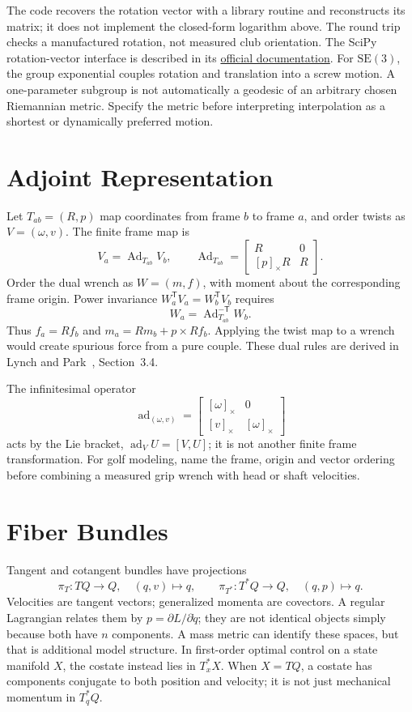 \documentclass[10pt,letterpaper,openany]{book}
\theoremstyle{plain}
\theoremstyle{definition}
\theoremstyle{remark}
\renewcommand{\T}{\mathsf{T}}   %
\renewcommand{\SE}{\mathrm{SE}}
\begin{document}
The code recovers the rotation vector with a library routine and reconstructs
its matrix; it does not implement the closed-form logarithm above. The round
trip checks a manufactured rotation, not measured club orientation.
The SciPy rotation-vector interface is described in its
\href{https://docs.scipy.org/doc/scipy/reference/generated/scipy.spatial.transform.Rotation.as_rotvec.html}{official documentation}.
For $\SE(3)$, the group exponential couples rotation and translation into a screw
motion. A one-parameter subgroup is not automatically a geodesic of an arbitrary
chosen Riemannian metric. Specify the metric before interpreting interpolation
as a shortest or dynamically preferred motion.

\section{Adjoint Representation}

Let $T_{ab}=(R,p)$ map coordinates from frame $b$ to frame $a$, and order twists
as $V=(\omega,v)$. The finite frame map is
\[
 V_a=\operatorname{Ad}_{T_{ab}}V_b,\qquad
 \operatorname{Ad}_{T_{ab}}=
 \begin{bmatrix}R&0\\ {[p]_\times R}&R\end{bmatrix}.
\]
Order the dual wrench as $W=(m,f)$, with moment about the corresponding frame
origin. Power invariance $W_a^\T V_a=W_b^\T V_b$ requires
\[
 W_a=\operatorname{Ad}_{T_{ab}}^{-\T}W_b.
\]
Thus $f_a=Rf_b$ and $m_a=Rm_b+p\times Rf_b$. Applying the twist map to a wrench
would create spurious force from a pure couple. These dual rules are derived in
Lynch and Park~\cite{Lynch2017}, Section~3.4.

The infinitesimal operator
\[
 \operatorname{ad}_{(\omega,v)}=
 \begin{bmatrix}[\omega]_\times&0\\ {[v]_\times}&[\omega]_\times\end{bmatrix}
\]
acts by the Lie bracket, $\operatorname{ad}_V U=[V,U]$; it is not another finite
frame transformation. For golf modeling, name the frame, origin and vector
ordering before combining a measured grip wrench with head or shaft velocities.

\section{Fiber Bundles}

Tangent and cotangent bundles have projections
\[
 \pi_T:TQ\to Q,\quad(q,v)\mapsto q,\qquad
 \pi_{T^*}:T^*Q\to Q,\quad(q,p)\mapsto q.
\]
Velocities are tangent vectors; generalized momenta are covectors. A regular
Lagrangian relates them by $p=\partial L/\partial\dot q$; they are not identical
objects simply because both have $n$ components. A mass metric can identify
these spaces, but that is additional model structure. In first-order optimal
control on a state manifold $X$, the costate instead lies in $T_x^*X$. When
$X=TQ$, a costate has components conjugate to both position and velocity; it is
not just mechanical momentum in $T_q^*Q$.
\end{document}
